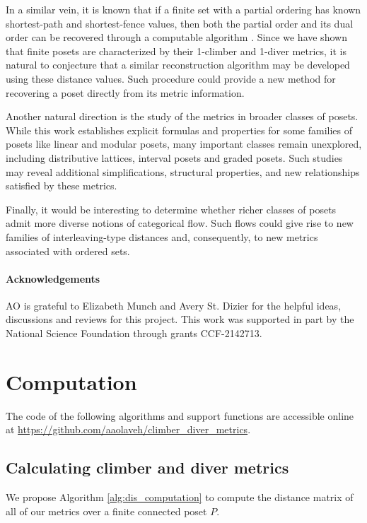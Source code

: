 \documentclass{article}[12pt]
\theoremstyle{exampstyle}
\theoremstyle{remark}
\begin{document}
In a similar vein, it is known that if a finite set with a partial ordering has known shortest-path and shortest-fence values, then both the partial order and its dual order can be recovered through a computable algorithm \cite{belding}. Since we have shown that finite posets are characterized by their 1-climber and 1-diver metrics, it is natural to conjecture that a similar reconstruction algorithm may be developed using these distance values. Such procedure could provide a new method for recovering  a poset directly from its metric information.

Another natural direction is the study of the metrics in broader classes of posets. While this work establishes explicit formulas and properties for some families of posets like linear and modular posets, many important classes remain unexplored, including distributive lattices, interval posets and graded posets. Such studies may reveal additional simplifications, structural properties, and new relationships satisfied by these metrics.

Finally, it would be interesting to determine whether richer classes of posets admit more diverse notions of categorical flow. Such flows could give rise to new families of interleaving-type distances and, consequently, to new metrics associated with ordered sets.

\paragraph{Acknowledgements}
AO is grateful to Elizabeth Munch and Avery St. Dizier for the helpful ideas, discussions and reviews for this project.
This work was supported in part by the National Science Foundation through grants CCF-2142713.

\newpage



\appendix
\section{Computation}
\label{Appendix}
The code of the following algorithms and support functions are accessible online at \url{https://github.com/aaolaveh/climber_diver_metrics}.

\subsection{Calculating climber and diver metrics}

We propose Algorithm \ref{alg:dis_computation} to compute the distance matrix of all of our metrics over a finite connected poset $P$. 
\end{document}
